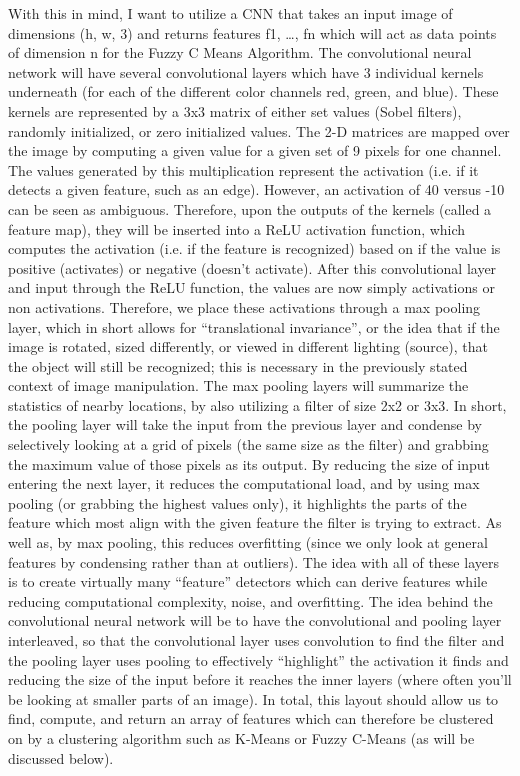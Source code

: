\documentclass[10pt,twocolumn]{article}
\begin{document}
With this in mind, I want to utilize a CNN that takes an input image of dimensions (h, w, 3) and returns features {f1, …, fn} which will act as data points of dimension n for the Fuzzy C Means Algorithm. The convolutional neural network will have several convolutional layers which have 3 individual kernels underneath (for each of the different color channels red, green, and blue). These kernels are represented by a 3x3 matrix of either set values (Sobel filters), randomly initialized, or zero initialized values. The 2-D matrices are mapped over the image by computing a given value for a given set of 9 pixels for one channel. The values generated by this multiplication represent the activation (i.e. if it detects a given feature, such as an edge). However, an activation of 40 versus -10 can be seen as ambiguous. Therefore, upon the outputs of the kernels (called a feature map), they will be inserted into a ReLU activation function, which computes the activation (i.e. if the feature is recognized) based on if the value is positive (activates) or negative (doesn’t activate). After this convolutional layer and input through the ReLU function, the values are now simply activations or non activations. Therefore, we place these activations through a max pooling layer, which in short allows for “translational invariance”, or the idea that if the image is rotated, sized differently, or viewed in different lighting (source), that the object will still be recognized; this is necessary in the previously stated context of image manipulation. The max pooling layers will summarize the statistics of nearby locations, by also utilizing a filter of size 2x2 or 3x3. In short, the pooling layer will take the input from the previous layer and condense by selectively looking at a grid of pixels (the same size as the filter) and grabbing the maximum value of those pixels as its output. By reducing the size of input entering the next layer, it reduces the computational load, and by using max pooling (or grabbing the highest values only), it highlights the parts of the feature which most align with the given feature the filter is trying to extract. As well as, by max pooling, this reduces overfitting (since we only look at general features by condensing rather than at outliers). The idea with all of these layers is to create virtually many “feature” detectors which can derive features while reducing computational complexity, noise, and overfitting. The idea behind the convolutional neural network will be to have the convolutional and pooling layer interleaved, so that the convolutional layer uses convolution to find the filter and the pooling layer uses pooling to effectively “highlight” the activation it finds and reducing the size of the input before it reaches the inner layers (where often you’ll be looking at smaller parts of an image). In total, this layout should allow us to find, compute, and return an array of features which can therefore be clustered on by a clustering algorithm such as K-Means or Fuzzy C-Means (as will be discussed below). \\
\end{document}
